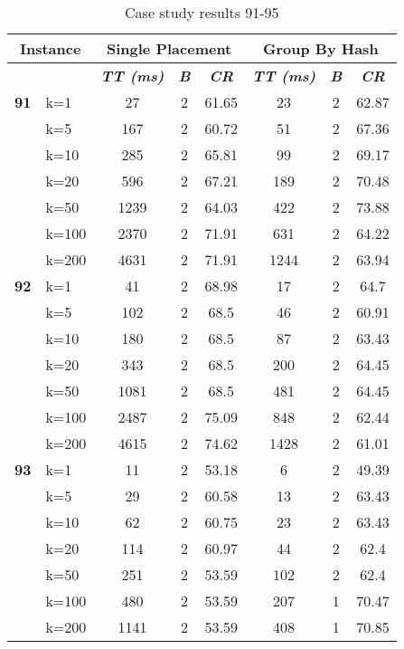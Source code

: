     \begin{table}[htbp]
    \caption{Case study results 91-95}
    \centering
    \begin{tabular}{|l|l|c|c|c|c|c|c|}
    \hline
    \multicolumn{ 2}{|c|}{\textbf{Instance}} & \multicolumn{ 3}{c|}{\textbf{Single Placement}} & \multicolumn{ 3}{c|}{\textbf{Group By Hash}} \\ \hline
    \multicolumn{ 2}{|l|}{} & \textbf{\textit{TT (ms)}} & \textbf{\textit{B}} & \textbf{\textit{CR}} & \textbf{\textit{TT (ms)}} & \textbf{\textit{B}} & \textbf{\textit{CR}} \\ \hline
    \multicolumn{1}{|r|}{\textbf{91}} & k=1 & 27 & 2 & 61.65 & 23 & 2 & 62.87 \\ 
     & k=5 & 167 & 2 & 60.72 & 51 & 2 & 67.36 \\ 
     & k=10 & 285 & 2 & 65.81 & 99 & 2 & 69.17 \\ 
     & k=20 & 596 & 2 & 67.21 & 189 & 2 & 70.48 \\ 
     & k=50 & 1239 & 2 & 64.03 & 422 & 2 & 73.88 \\ 
     & k=100 & 2370 & 2 & 71.91 & 631 & 2 & 64.22 \\ 
     & k=200 & 4631 & 2 & 71.91 & 1244 & 2 & 63.94 \\ \hline
    \multicolumn{1}{|r|}{\textbf{92}} & k=1 & 41 & 2 & 68.98 & 17 & 2 & 64.7 \\ 
     & k=5 & 102 & 2 & 68.5 & 46 & 2 & 60.91 \\ 
     & k=10 & 180 & 2 & 68.5 & 87 & 2 & 63.43 \\ 
     & k=20 & 343 & 2 & 68.5 & 200 & 2 & 64.45 \\ 
     & k=50 & 1081 & 2 & 68.5 & 481 & 2 & 64.45 \\ 
     & k=100 & 2487 & 2 & 75.09 & 848 & 2 & 62.44 \\ 
     & k=200 & 4615 & 2 & 74.62 & 1428 & 2 & 61.01 \\ \hline
    \multicolumn{1}{|r|}{\textbf{93}} & k=1 & 11 & 2 & 53.18 & 6 & 2 & 49.39 \\ 
     & k=5 & 29 & 2 & 60.58 & 13 & 2 & 63.43 \\ 
     & k=10 & 62 & 2 & 60.75 & 23 & 2 & 63.43 \\ 
     & k=20 & 114 & 2 & 60.97 & 44 & 2 & 62.4 \\ 
     & k=50 & 251 & 2 & 53.59 & 102 & 2 & 62.4 \\ 
     & k=100 & 480 & 2 & 53.59 & 207 & 1 & 70.47 \\ 
     & k=200 & 1141 & 2 & 53.59 & 408 & 1 & 70.85 \\ \hline

\end{tabular}
\end{table}
